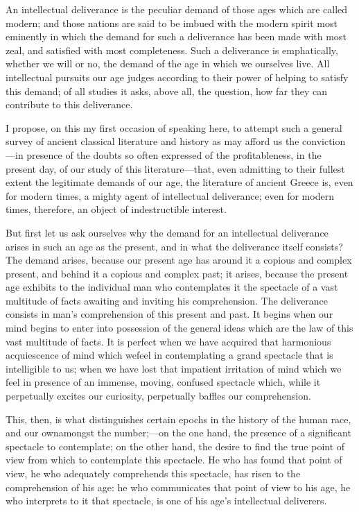 An intellectual deliverance is the peculiar demand of those ages which
are called modern; and those nations are said to be imbued with the
modern spirit most eminently in which the demand for such a deliverance
has been made with most zeal, and satisfied with most completeness. Such
a deliverance is emphatically, whether we will or no, the demand of the
age in which we ourselves live. All intellectual pursuits our age judges
according to their power of helping to satisfy this demand; of all
studies it asks, above all, the question, how far they can contribute to
this deliverance.

I propose, on this my first occasion of speaking here, to attempt such a
general survey of ancient classical literature and history as may afford
us the conviction---in presence of the doubts so often expressed of the
profitableness, in the present day, of our study of this
literature---that, even admitting to their fullest extent the legitimate
demands of our age, the literature of ancient Greece is, even for modern
times, a mighty agent of intellectual deliverance; even for modern
times, therefore, an object of indestructible interest.

But first let us ask ourselves why the demand for an intellectual
deliverance arises in such an age as the present, and in what the
deliverance itself consists? The demand arises, because our present age
has around it a copious and complex present, and behind it a copious and
complex past; it arises, because the present age exhibits to the
individual man who contemplates it the spectacle of a vast multitude of
facts awaiting and inviting his comprehension. The deliverance consists
in man's comprehension of this present and past. It begins when our mind
begins to enter into possession of the general ideas which are the law
of this vast multitude of facts. It is perfect when we have acquired
that harmonious acquiescence of mind which wefeel in contemplating a
grand spectacle that is intelligible to us; when we have lost that
impatient irritation of mind which we feel in presence of an immense,
moving, confused spectacle which, while it perpetually excites our
curiosity, perpetually baffles our comprehension.

This, then, is what distinguishes certain epochs in the history of the
human race, and our ownamongst the number;---on the one hand, the
presence of a significant spectacle to contemplate; on the other hand,
the desire to find the true point of view from which to contemplate this
spectacle. He who has found that point of view, he who adequately
comprehends this spectacle, has risen to the comprehension of his age:
he who communicates that point of view to his age, he who interprets to
it that spectacle, is one of his age's intellectual deliverers.

